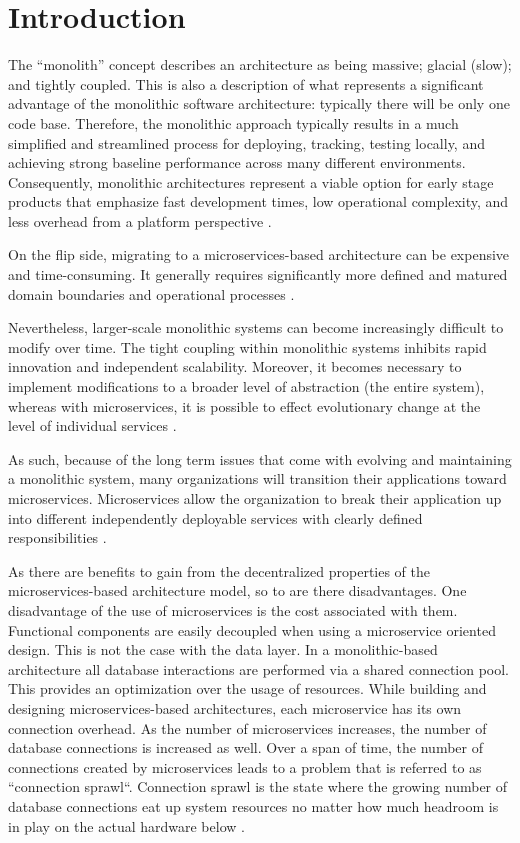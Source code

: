 \documentclass[smallextended,natbib]{svjour3}
\begin{document}
\section{Introduction}

The ``monolith'' concept describes an architecture as being massive; glacial (slow); and tightly coupled. This is also a description of what represents a significant advantage of the monolithic software architecture: typically there will be only one code base. Therefore, the monolithic approach typically results in a much simplified and streamlined process for deploying, tracking, testing locally, and achieving strong baseline performance across many different environments. Consequently, monolithic architectures represent a viable option for early stage products that emphasize fast development times, low operational complexity, and less overhead from a platform perspective \cite{atlassian_microservices_vs_monolith,fowler_monolith_first}.

On the flip side, migrating to a microservices-based architecture can be expensive and time-consuming. It generally requires significantly more defined and matured domain boundaries and operational processes \cite{jamshidi2018microservices,taibi2017processes}.

Nevertheless, larger-scale monolithic systems can become increasingly difficult to modify over time. The tight coupling within monolithic systems inhibits rapid innovation and independent scalability. Moreover, it becomes necessary to implement modifications to a broader level of abstraction (the entire system), whereas with microservices, it is possible to effect evolutionary change at the level of individual services \cite{dragoni_microservices,newman_microservices}.

As such, because of the long term issues that come with evolving and maintaining a monolithic system, many organizations will transition their applications toward microservices. Microservices allow the organization to break their application up into different independently deployable services with clearly defined responsibilities \cite{newman_microservices,richardson_microservices}.


As there are benefits to gain from the decentralized properties of the microservices-based architecture model, so to are there disadvantages. One disadvantage of the use of microservices is the cost associated with them. Functional components are easily decoupled when using a microservice oriented design. This is not the case with the data layer. In a monolithic-based architecture all database interactions are performed via a shared connection pool. This provides an optimization over the usage of resources. While building and designing microservices-based architectures, each microservice has its own connection overhead. As the number of microservices increases, the number of database connections is increased as well. Over a span of time, the number of connections created by microservices leads to a problem that is referred to as ``connection sprawl``. Connection sprawl is the state where the growing number of database connections eat up system resources no matter how much headroom is in play on the actual hardware below \cite{newman_microservices}.
\end{document}
